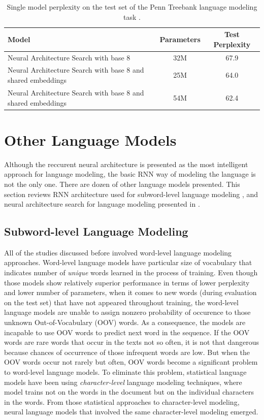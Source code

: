 \documentclass{IEEEtran}
\begin{document}
\begin{table}[!t]
\caption{Single model perplexity on the test set of the Penn Treebank language modeling task \cite{Quoc2017Reinforcement}.}
\label{tab:search}
\centering
\begin{tabular}{ l|c c }
\toprule
\textbf{Model} & \textbf{Parameters} & \textbf{Test Perplexity} \\
\hline
Neural Architecture Search with base 8 & 32M & 67.9 \\
Neural Architecture Search with base 8 and shared embeddings & 25M & 64.0 \\
Neural Architecture Search with base 8 and shared embeddings & 54M & 62.4 \\
\bottomrule
\end{tabular}
\end{table}

\section{Other Language Models}

Although the reccurent neural architecture is presented as the most intelligent approach for language modeling, the basic RNN way of modeling the language is not the only one. There are dozen of other language models presented. This section reviews RNN architecture used for subword-level language modeling \cite{Mikolov2011SubwordLM}, and neural architecture search for language modeling presented in \cite{Quoc2017Reinforcement}.

\subsection{Subword-level Language Modeling}

All of the studies discussed before involved word-level language modeling approaches. Word-level language models have particular size of vocabulary that indicates number of \textit{unique} words learned in the process of training. Even though those models show relatively superior performance in terms of lower perplexity and lower number of parameters, when it comes to new words (during evaluation on the test set) that have not appeared throughout training, the word-level language models are unable to assign nonzero probability of occurence to those unknown Out-of-Vocabulary (OOV) words. As a consequence, the models are incapable to use OOV words to predict next word in the sequence. If the OOV words are rare words that occur in the texts not so often, it is not that dangerous because chances of occurrence of those infrequent words are low. But when the OOV words occur not rarely but often, OOV words become a significant problem to word-level language models. To eliminate this problem, statistical language models have been using \textit{character-level} language modeling techniques, where model trains not on the words in the document but on the individual characters in the words. From those statistical approaches to character-level modeling, neural language models that involved the same character-level modeling emerged.
\end{document}
